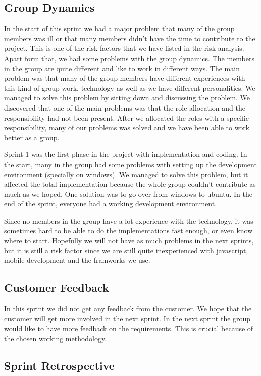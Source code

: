 \subsection{Group Dynamics}
	In the start of this sprint we had a major problem that many of the group members was ill or 
	that many members didn't have the time to contribute to the project. 
	This is one of the risk factors 
	that we have listed in the risk analysis. 
	Apart form that, we had some problems with the group dynamics. The members in the group are 
	quite different and like to work in different ways. The main problem was 
	that many of the group members
	have different experiences with this kind of group work, technology as well as we have 
	different personalities.
	We managed to solve this problem by sitting down and discussing the problem. We discovered that
	one of the main problems was that the role allocation and the responsibility had not 
	been present.
	After we allocated the roles with a specific responsibility, many of our problems was solved and
	we have been able to work better as a group.

	Sprint 1 was the first phase in the project with implementation and coding. In the start, 
	many in the group had
	some problems with setting up the development environment (specially on windows). We managed
	to solve this problem, but it affected the total implementation because the whole group couldn't 
	contribute as much as we hoped. One solution was to go over from windows to ubuntu. 
	In the end of the sprint, everyone had a working development environment.

	Since no members in the group have a lot experience with the technology, it was sometimes hard
	to be able to do the implementations fast enough, or even know where to start. 
	Hopefully we will not have as much problems in the next sprints, but it is still a risk factor 
	since we are still quite inexperienced with javascript, mobile development and the framworks we use. 

\subsection{Customer Feedback}
	In this sprint we did not get any feedback from the customer. We hope that the customer
	will get more involved in the next sprint. In the next sprint the group would like to have
	more feedback on the requirements. This is crucial because of the chosen working 
	methodology.

\subsection{Sprint Retrospective}
